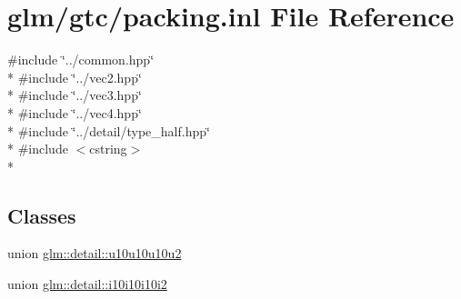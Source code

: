 \hypertarget{packing_8inl}{\section{glm/gtc/packing.inl File Reference}
\label{packing_8inl}
}
{\ttfamily \#include \char`\"{}../common.\-hpp\char`\"{}}\\*
{\ttfamily \#include \char`\"{}../vec2.\-hpp\char`\"{}}\\*
{\ttfamily \#include \char`\"{}../vec3.\-hpp\char`\"{}}\\*
{\ttfamily \#include \char`\"{}../vec4.\-hpp\char`\"{}}\\*
{\ttfamily \#include \char`\"{}../detail/type\-\_\-half.\-hpp\char`\"{}}\\*
{\ttfamily \#include $<$cstring$>$}\\*
\subsection*{Classes}
\begin{DoxyCompactItemize}
\item 
union \hyperlink{unionglm_1_1detail_1_1u10u10u10u2}{glm\-::detail\-::u10u10u10u2}
\item 
union \hyperlink{unionglm_1_1detail_1_1i10i10i10i2}{glm\-::detail\-::i10i10i10i2}
\end{DoxyCompactItemize}
